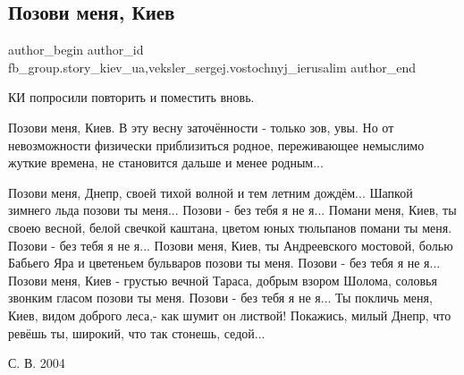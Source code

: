  
 
 
 
 
 
\subsection{Позови меня, Киев}
\label{sec:27_02_2022.fb.fb_group.story_kiev_ua.1.pozovi_menja_kiev}
 
\ifcmt
 author_begin
   author_id fb_group.story_kiev_ua,veksler_sergej.vostochnyj_ierusalim
 author_end
\fi

КИ попросили повторить и поместить вновь.

Позови меня, Киев. В эту весну заточённости - только зов, увы. Но от
невозможности физически приблизиться родное, переживающее немыслимо жуткие
времена, не становится дальше и менее родным...

\raggedcolumns
\begin{multicols}{2} %
\setlength{\parindent}{0pt}

\obeycr
Позови меня, Днепр,
своей тихой волной
и тем летним дождём...
\smallskip
Шапкой зимнего льда 
позови ты меня...
Позови - без тебя я не я...
\smallskip
Помани меня, Киев,
ты своею весной,
белой свечкой каштана,
цветом юных тюльпанов
помани ты меня.
\smallskip
Позови - без тебя я не я...
Позови меня, Киев,
ты Андреевского мостовой,
болью Бабьего Яра
и цветеньем бульваров
позови ты меня.
\smallskip
Позови - без тебя я не я...
Позови меня, Киев - 
грустью вечной Тараса,
добрым взором Шолома,
соловья звонким гласом
позови ты меня.
\smallskip
Позови - без тебя я не я...
\smallskip
Ты покличь меня, Киев,
видом доброго леса,-
как шумит он листвой!
\smallskip
Покажись, милый Днепр,
что ревёшь ты, широкий,
что так стонешь, седой...
\restorecr

\end{multicols} %

С. В. 2004

